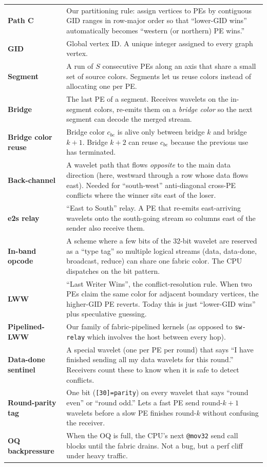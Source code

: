 \documentclass[11pt]{article}
\newcommand{\code}[1]{\texttt{#1}}
\begin{document}
\begin{longtable}{p{4.0cm} p{10.5cm}}
\textbf{Path C} & Our partitioning rule: assign vertices to PEs by contiguous GID ranges in row-major order so that ``lower-GID wins'' automatically becomes ``western (or northern) PE wins.'' \\
\textbf{GID} & Global vertex ID. A unique integer assigned to every graph vertex. \\
\textbf{Segment} & A run of $S$ consecutive PEs along an axis that share a small set of source colors. Segments let us reuse colors instead of allocating one per PE. \\
\textbf{Bridge} & The last PE of a segment. Receives wavelets on the in-segment colors, re-emits them on a \emph{bridge color} so the next segment can decode the merged stream. \\
\textbf{Bridge color reuse} & Bridge color $c_{be}$ is alive only between bridge $k$ and bridge $k{+}1$. Bridge $k{+}2$ can reuse $c_{be}$ because the previous use has terminated. \\
\textbf{Back-channel} & A wavelet path that flows \emph{opposite} to the main data direction (here, westward through a row whose data flows east). Needed for ``south-west'' anti-diagonal cross-PE conflicts where the winner sits east of the loser. \\
\textbf{e2s relay} & ``East to South'' relay. A PE that re-emits east-arriving wavelets onto the south-going stream so columns east of the sender also receive them. \\
\textbf{In-band opcode} & A scheme where a few bits of the 32-bit wavelet are reserved as a ``type tag'' so multiple logical streams (data, data-done, broadcast, reduce) can share one fabric color. The CPU dispatches on the bit pattern. \\
\textbf{LWW} & ``Last Writer Wins'', the conflict-resolution rule. When two PEs claim the same color for adjacent boundary vertices, the higher-GID PE reverts. Today this is just ``lower-GID wins'' plus speculative guessing. \\
\textbf{Pipelined-LWW} & Our family of fabric-pipelined kernels (as opposed to \code{sw-relay} which involves the host between every hop). \\
\textbf{Data-done sentinel} & A special wavelet (one per PE per round) that says ``I have finished sending all my data wavelets for this round.'' Receivers count these to know when it is safe to detect conflicts. \\
\textbf{Round-parity tag} & One bit (\code{[30]=parity}) on every wavelet that says ``round even'' or ``round odd.'' Lets a fast PE send round-$k{+}1$ wavelets before a slow PE finishes round-$k$ without confusing the receiver. \\
\textbf{OQ backpressure} & When the OQ is full, the CPU's next \code{@mov32} send call blocks until the fabric drains. Not a bug, but a perf cliff under heavy traffic. \\
\bottomrule
\end{longtable}
\end{document}
